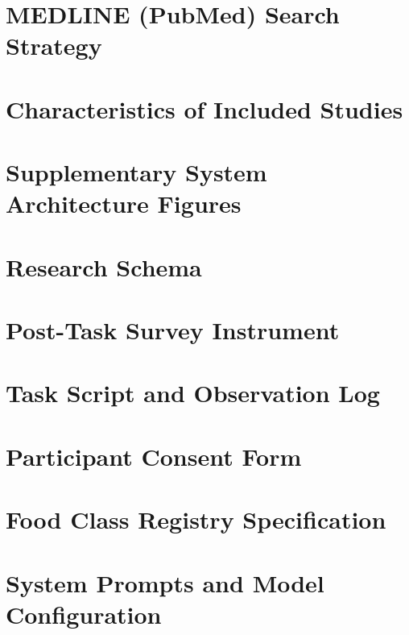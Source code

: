 \chapter{MEDLINE (PubMed) Search Strategy}
\label{app:search-strategy}



\chapter{Characteristics of Included Studies}
\label{app:included-studies}



\chapter{Supplementary System Architecture Figures}



\chapter{Research Schema}



\chapter{Post-Task Survey Instrument}



\chapter{Task Script and Observation Log}



\chapter{Participant Consent Form}
\label{app:consent}



\chapter{Food Class Registry Specification}



\chapter{System Prompts and Model Configuration}
\label{app:prompts}


